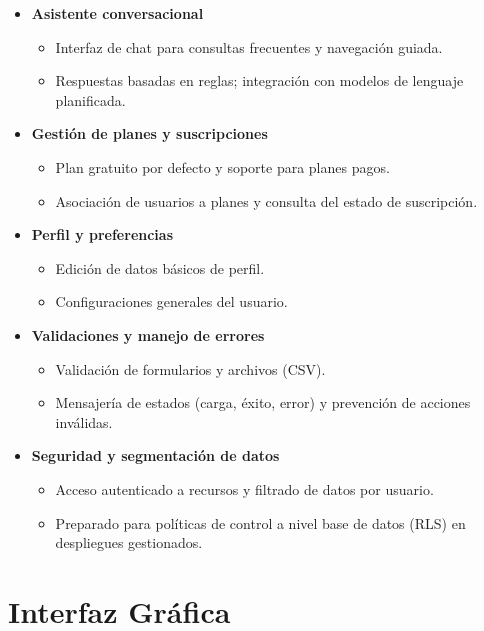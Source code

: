 \begin{itemize}
    \item \textbf{Asistente conversacional}
    \begin{itemize}
        \item Interfaz de chat para consultas frecuentes y navegación guiada.
        \item Respuestas basadas en reglas; integración con modelos de lenguaje planificada.
    \end{itemize}

    \item \textbf{Gestión de planes y suscripciones}
    \begin{itemize}
        \item Plan gratuito por defecto y soporte para planes pagos.
        \item Asociación de usuarios a planes y consulta del estado de suscripción.
    \end{itemize}

    \item \textbf{Perfil y preferencias}
    \begin{itemize}
        \item Edición de datos básicos de perfil.
        \item Configuraciones generales del usuario.
    \end{itemize}

    \item \textbf{Validaciones y manejo de errores}
    \begin{itemize}
        \item Validación de formularios y archivos (CSV).
        \item Mensajería de estados (carga, éxito, error) y prevención de acciones inválidas.
    \end{itemize}

    \item \textbf{Seguridad y segmentación de datos}
    \begin{itemize}
        \item Acceso autenticado a recursos y filtrado de datos por usuario.
        \item Preparado para políticas de control a nivel base de datos (RLS) en despliegues gestionados.
    \end{itemize}
\end{itemize}

\vspace{1cm}

\section{Interfaz Gráfica}

